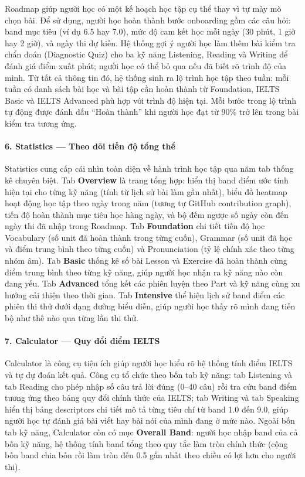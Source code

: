 Roadmap giúp người học có một kế hoạch học tập cụ thể thay vì tự mày mò chọn bài. Để sử dụng, người học hoàn thành bước onboarding gồm các câu hỏi: band mục tiêu (ví dụ 6.5 hay 7.0), mức độ cam kết học mỗi ngày (30 phút, 1 giờ hay 2 giờ), và ngày thi dự kiến. Hệ thống gợi ý người học làm thêm bài kiểm tra chẩn đoán (Diagnostic Quiz) cho ba kỹ năng Listening, Reading và Writing để đánh giá điểm xuất phát; người học có thể bỏ qua nếu đã biết rõ trình độ của mình. Từ tất cả thông tin đó, hệ thống sinh ra lộ trình học tập theo tuần: mỗi tuần có danh sách bài học và bài tập cần hoàn thành từ Foundation, IELTS Basic và IELTS Advanced phù hợp với trình độ hiện tại. Mỗi bước trong lộ trình tự động được đánh dấu ``Hoàn thành'' khi người học đạt từ 90\% trở lên trong bài kiểm tra tương ứng.

\paragraph{6. Statistics --- Theo dõi tiến độ tổng thể}

Statistics cung cấp cái nhìn toàn diện về hành trình học tập qua năm tab thống kê chuyên biệt. Tab \textbf{Overview} là trang tổng hợp: hiển thị band điểm ước tính hiện tại cho từng kỹ năng (tính từ lịch sử bài làm gần nhất), biểu đồ heatmap hoạt động học tập theo ngày trong năm (tương tự GitHub contribution graph), tiến độ hoàn thành mục tiêu học hàng ngày, và bộ đếm ngược số ngày còn đến ngày thi đã nhập trong Roadmap. Tab \textbf{Foundation} chi tiết tiến độ học Vocabulary (số unit đã hoàn thành trong từng cuốn), Grammar (số unit đã học và điểm trung bình theo từng cuốn) và Pronunciation (tỷ lệ chính xác theo từng nhóm âm). Tab \textbf{Basic} thống kê số bài Lesson và Exercise đã hoàn thành cùng điểm trung bình theo từng kỹ năng, giúp người học nhận ra kỹ năng nào còn đang yếu. Tab \textbf{Advanced} tổng kết các phiên luyện theo Part và kỹ năng cùng xu hướng cải thiện theo thời gian. Tab \textbf{Intensive} thể hiện lịch sử band điểm các phiên thi thử dưới dạng đường biểu diễn, giúp người học thấy rõ mình đang tiến bộ như thế nào qua từng lần thi thử.

\paragraph{7. Calculator --- Quy đổi điểm IELTS}

Calculator là công cụ tiện ích giúp người học hiểu rõ hệ thống tính điểm IELTS và tự dự đoán kết quả. Công cụ tổ chức theo bốn tab kỹ năng: tab Listening và tab Reading cho phép nhập số câu trả lời đúng (0--40 câu) rồi tra cứu band điểm tương ứng theo bảng quy đổi chính thức của IELTS; tab Writing và tab Speaking hiển thị bảng descriptors chi tiết mô tả từng tiêu chí từ band 1.0 đến 9.0, giúp người học tự đánh giá bài viết hay bài nói của mình đang ở mức nào. Ngoài bốn tab kỹ năng, Calculator còn có mục \textbf{Overall Band}: người học nhập band của cả bốn kỹ năng, hệ thống tính band tổng theo quy tắc làm tròn chính thức (cộng bốn band chia bốn rồi làm tròn đến 0.5 gần nhất theo chiều có lợi hơn cho người thi).

